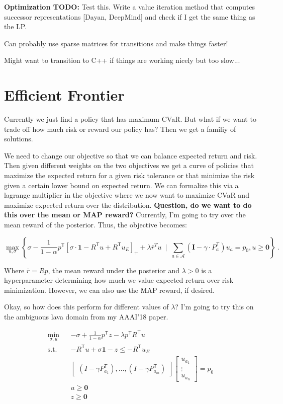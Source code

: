 \documentclass{article}
\newcommand{\tr}{^\mathsf{T}}
\newcommand{\one}{\mathbf{1}}
\newcommand{\zero}{\mathbf{0}}
\newcommand{\eye}{\mathbf{I}}
\begin{document}
\textbf{Optimization TODO: }
Test this. Write a value iteration method that computes successor representations [Dayan, DeepMind] and check if I get the same thing as the LP.

Can probably use sparse matrices for transitions and make things faster!

Might want to transition to C++ if things are working nicely but too slow...

\section{Efficient Frontier}
Currently we just find a policy that has maximum CVaR. But what if we want to trade off how much risk or reward our policy has? Then we get a familiy of solutions. 

We need to change our objective so that we can balance expected return and risk. Then given different weights on the two objectives we get a curve of policies that maximize the expected return for a given risk tolerance or that minimize the risk given a certain lower bound on expected return. We can formalize this via a lagrange multiplier in the objective where we now want to maximize CVaR and maximize expected return over the distribution. \textbf{Question, do we want to do this over the mean or MAP reward?} Currently, I'm going to try over the mean reward of the posterior. Thus, the objective becomes:

	\begin{equation} \label{eq:lp_objective}
	\max_{u,\sigma} \left\{ \sigma -\frac{1}{1-\alpha} p\tr \left[\sigma\cdot\one - R\tr u  + R\tr u_E \right]_+ + \lambda \bar{r}^T u ~\mid~ \sum_{a\in\mathcal{A}} (\eye - \gamma\cdot P_a\tr) u_a = p_0, u \ge \zero \right\}~.  
	\end{equation}

Where $\bar{r} = Rp$, the mean reward under the posterior and $\lambda>0$ is a hyperparameter determining how much we value expected return over risk minimization. However, we can also use the MAP reward, if desired.

Okay, so how does this perform for different values of $\lambda$? I'm going to try this on the ambiguous lava domain from my AAAI'18 paper. 

\begin{eqnarray}
\min_{\sigma, u}&& -\sigma + \frac{1}{1-\alpha}p\tr z - \lambda p\tr R\tr u \\
\text{s.t.}&& - R\tr u + \sigma \one  - z  \leq -R\tr u_E\\
&&\begin{bmatrix}
(I - \gamma P_{a_1}\tr), \ldots, (I - \gamma P_{a_m}\tr)
\end{bmatrix}
\begin{bmatrix}
u_{a_1} \\
\vdots\\
u_{a_n}
\end{bmatrix}
= p_0 \\
&& u \geq \zero \\
&& z \geq \zero 
\end{eqnarray}	
\end{document}
